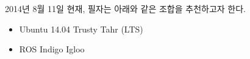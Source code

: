 2014년 8월 11일 현재, 필자는 아래와 같은 조합을 추천하고자 한다.

\begin{itemize}
\item Ubuntu 14.04 Trusty Tahr (LTS)
\item ROS Indigo Igloo
\end{itemize}





